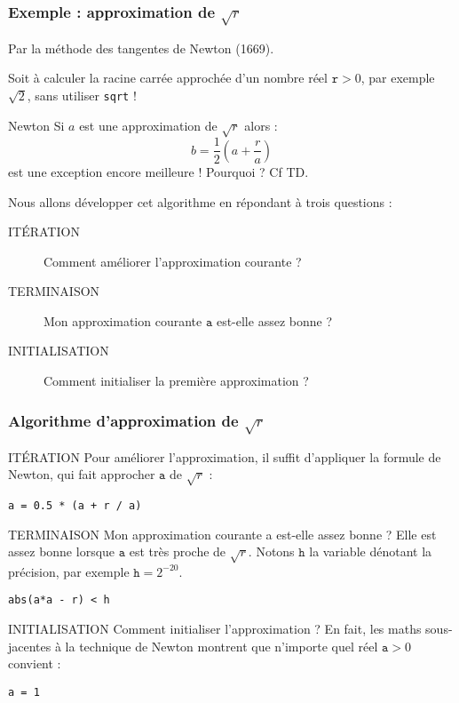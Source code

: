 \documentclass[10pt]{beamer}
\begin{document}
\begin{frame}
  \frametitle{Exemple : approximation de $\sqrt{r}$}
  Par la méthode des tangentes de Newton (1669).

  Soit à calculer la racine carrée approchée d'un nombre réel $\mathtt{r} > 0$, par exemple $\sqrt{2}$, sans utiliser \texttt{sqrt} !

  \begin{block}{Newton}
  Si $a$ est une approximation de $\sqrt{r}$ alors :
  \[
    b = \frac{1}{2}(a + \frac{r}{a})
  \]
  est une exception encore meilleure ! Pourquoi ? Cf TD.    
  \end{block}
  Nous allons développer cet algorithme en répondant à trois questions : 
  \begin{description}
  \item[ITÉRATION] Comment améliorer l'approximation courante ?
  \item[TERMINAISON] Mon approximation courante $\mathtt{a}$ est-elle assez bonne ?
  \item[INITIALISATION] Comment initialiser la première approximation ? 
  \end{description}
\end{frame}
\begin{frame}[fragile]
  \frametitle{Algorithme d'approximation de $\sqrt{r}$}
  \begin{block}{ITÉRATION}
    Pour \alert{améliorer} l'approximation, il suffit d'appliquer la formule de Newton, qui fait approcher $\mathtt{a}$ de $\sqrt{r}$ :
    \begin{lstlisting}[style=editor]
a = 0.5 * (a + r / a)       
    \end{lstlisting}    
  \end{block}

  \begin{block}{TERMINAISON}
  Mon approximation courante a est-elle \alert{assez bonne} ? Elle est assez bonne lorsque $\mathtt{a}$ est très proche de $\sqrt{r}$.
Notons $\mathtt{h}$ la variable dénotant la précision, par exemple $\mathtt{h} = 2^{-20}$.
\begin{lstlisting}[style=editor]
abs(a*a - r) < h    
\end{lstlisting}
\end{block}
\begin{block}{INITIALISATION}
  Comment \alert{initialiser} l'approximation ? En fait, les maths sous-jacentes à la technique de Newton montrent que n'importe quel réel $\mathtt{a} > 0$ convient :
  \begin{lstlisting}[style=editor]
a = 1      
  \end{lstlisting}
\end{block}
\end{frame}
\end{document}
